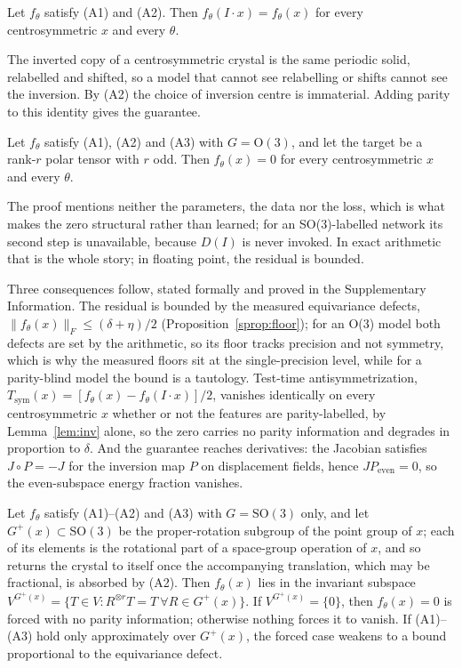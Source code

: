 \begin{lemma}\label{lem:inv}
Let $f_\theta$ satisfy (A1) and (A2). Then $f_\theta(I\!\cdot\!x) = f_\theta(x)$ for every centrosymmetric $x$ and every $\theta$.
\end{lemma}

The inverted copy of a centrosymmetric crystal is the same periodic solid, relabelled and shifted, so a model that cannot see relabelling or shifts cannot see the inversion. By (A2) the choice of inversion centre is immaterial. Adding parity to this identity gives the guarantee.

\begin{theorem}\label{thm:zero}
Let $f_\theta$ satisfy (A1), (A2) and (A3) with $G = \mathrm{O}(3)$, and let the target be a rank-$r$ polar tensor with $r$ odd. Then $f_\theta(x) = 0$ for every centrosymmetric $x$ and every $\theta$.
\end{theorem}

The proof mentions neither the parameters, the data nor the loss, which is what makes the zero structural rather than learned; for an SO(3)-labelled network its second step is unavailable, because $D(I)$ is never invoked. In exact arithmetic that is the whole story; in floating point, the residual is bounded.

Three consequences follow, stated formally and proved in the Supplementary Information. The residual is bounded by the measured equivariance defects, $\lVert f_\theta(x)\rVert_F \le (\delta + \eta)/2$ (Proposition~\ref{sprop:floor}); for an O(3) model both defects are set by the arithmetic, so its floor tracks precision and not symmetry, which is why the measured floors sit at the single-precision level, while for a parity-blind model the bound is a tautology. Test-time antisymmetrization, $T_{\mathrm{sym}}(x) = [f_\theta(x) - f_\theta(I\!\cdot\!x)]/2$, vanishes identically on every centrosymmetric $x$ whether or not the features are parity-labelled, by Lemma~\ref{lem:inv} alone, so the zero carries no parity information and degrades in proportion to $\delta$. And the guarantee reaches derivatives: the Jacobian satisfies $J\circ P = -J$ for the inversion map $P$ on displacement fields, hence $J P_{\mathrm{even}} = 0$, so the even-subspace energy fraction vanishes.

\begin{corollary}\label{cor:rot}
Let $f_\theta$ satisfy (A1)--(A2) and (A3) with $G=\mathrm{SO}(3)$ only, and let $G^{+}(x)\subset\mathrm{SO}(3)$ be the proper-rotation subgroup of the point group of $x$; each of its elements is the rotational part of a space-group operation of $x$, and so returns the crystal to itself once the accompanying translation, which may be fractional, is absorbed by (A2). Then $f_\theta(x)$ lies in the invariant subspace $V^{G^{+}(x)} = \{T \in V : R^{\otimes r}T = T\ \forall R \in G^{+}(x)\}$. If $V^{G^{+}(x)} = \{0\}$, then $f_\theta(x)=0$ is forced with no parity information; otherwise nothing forces it to vanish. If (A1)--(A3) hold only approximately over $G^{+}(x)$, the forced case weakens to a bound proportional to the equivariance defect.
\end{corollary}

